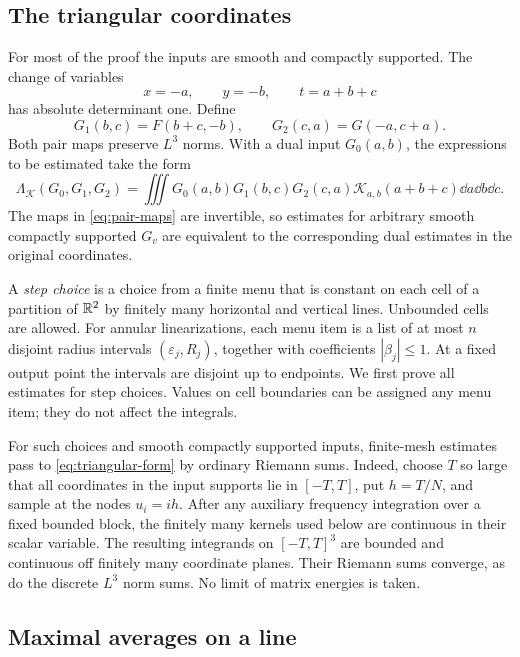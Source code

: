 \subsection{The triangular coordinates}

For most of the proof the inputs are smooth and compactly supported.
The change of variables
\[
 x=-a,\qquad y=-b,\qquad t=a+b+c
\]
has absolute determinant one. Define
\begin{equation}\label{eq:pair-maps}
 G_1(b,c)=F(b+c,-b),\qquad G_2(c,a)=G(-a,c+a).
\end{equation}
Both pair maps preserve $L^3$ norms. With a dual input $G_0(a,b)$,
the expressions to be estimated take the form
\begin{equation}\label{eq:triangular-form}
 \Lambda_{\mathcal K}(G_0,G_1,G_2)
 =\iiint G_0(a,b)G_1(b,c)G_2(c,a)
       \mathcal K_{a,b}(a+b+c)\dd a\dd b\dd c.
\end{equation}
The maps in \eqref{eq:pair-maps} are invertible, so estimates for
arbitrary smooth compactly supported $G_v$ are equivalent to the
corresponding dual estimates in the original coordinates.

A \emph{step choice} is a choice from a finite menu that is constant on
each cell of a partition of $\mathbb R^2$ by finitely many horizontal and
vertical lines. Unbounded cells are allowed. For annular linearizations,
each menu item is a list of at most $n$ disjoint radius intervals
$(\varepsilon_j,R_j)$, together with coefficients $|\beta_j|\le1$.
At a fixed output point the intervals are disjoint up to endpoints.
We first prove all estimates for step choices. Values on cell boundaries
can be assigned any menu item; they do not affect the integrals.

For such choices and smooth compactly supported inputs, finite-mesh
estimates pass to \eqref{eq:triangular-form} by ordinary Riemann sums.
Indeed, choose $T$ so large that all coordinates in the input supports
lie in $[-T,T]$, put $h=T/N$, and sample at the nodes $u_i=ih$.
After any auxiliary frequency integration over a fixed bounded block,
the finitely many kernels used below are continuous in their scalar
variable. The resulting integrands on $[-T,T]^3$ are bounded and
continuous off finitely many coordinate planes. Their Riemann sums
converge, as do the discrete $L^3$ norm sums. No limit of matrix
energies is taken.

\subsection{Maximal averages on a line}

